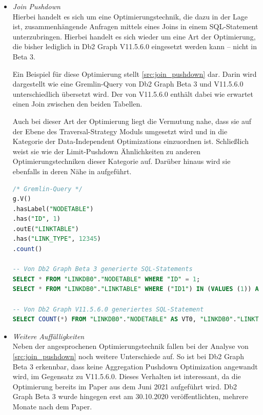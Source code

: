 \begin{itemize}
    Durch den Einsatz Optimierungstechnik, kann es somit vermieden werden, den gesamten Inhalt einer oder mehrerer Vertex- beziehungsweise Edge-Tabellen abzufragen, nur um lediglich 100 Knoten, wie im \autoref{src:nachweis_limit_pushdown} abzufragen. Daher dürfte diese Optimierung einen erheblichen Einfluss auf die Performance von Db2 Graph haben, besonders bei großen Tabellen.

    \item \textit{Join Pushdown}\\
    Hierbei handelt es sich um eine Optimierungstechnik, die dazu in der Lage ist, zusammenhängende Anfragen mittels eines Joins in einem SQL-Statement unterzubringen. Hierbei handelt es sich wieder um eine Art der Optimierung, die bisher lediglich in Db2 Graph V11.5.6.0 eingesetzt werden kann -- nicht in Beta 3.

    Ein Beispiel für diese Optimierung stellt \autoref{src:join_pushdown} dar. Darin wird dargestellt wie eine Gremlin-Query von Db2 Graph Beta 3 und V11.5.6.0 unterschiedlich übersetzt wird. Der von V11.5.6.0 enthält dabei wie erwartet einen Join zwischen den beiden Tabellen.

    Auch bei dieser Art der Optimierung liegt die Vermutung nahe, dass sie auf der Ebene des Traversal-Strategy Moduls umgesetzt wird und in die Kategorie der Data-Independent Optimizations einzuordnen ist. Schließlich weist sie wie der Limit-Pushdown Ähnlichkeiten zu anderen Optimierungstechniken dieser Kategorie auf. Darüber hinaus wird sie ebenfalls in deren Nähe in \cite{ibm_docs_optimize} aufgeführt.

\begin{lstlisting}[label=src:join_pushdown,caption={Beispiel Join Pushdown},language=SQL]
/* Gremlin-Query */
g.V()
.hasLabel("NODETABLE")
.has("ID", 1)
.outE("LINKTABLE")
.has("LINK_TYPE", 12345)
.count()

-- Von Db2 Graph Beta 3 generierte SQL-Statements
SELECT * FROM "LINKDB0"."NODETABLE" WHERE "ID" = 1;
SELECT * FROM "LINKDB0"."LINKTABLE" WHERE ("ID1") IN (VALUES (1)) AND "LINK_TYPE" = 12345;

-- Von Db2 Graph V11.5.6.0 generiertes SQL-Statement
SELECT COUNT(*) FROM "LINKDB0"."NODETABLE" AS VT0, "LINKDB0"."LINKTABLE" AS ET1 WHERE VT0."ID" = 1 AND ET1."LINK_TYPE" = 12345 AND VT0.ID = ET1.ID1
\end{lstlisting}

    \item \textit{Weitere Auffälligkeiten}\\
    Neben der angesprochenen Optimierungstechnik fallen bei der Analyse von \autoref{src:join_pushdown} noch weitere Unterschiede auf. So ist bei Db2 Graph Beta 3 erkennbar, dass keine Aggregation Pushdown Optimization angewandt wird, im Gegensatz zu V11.5.6.0. Dieses Verhalten ist interessant, da die Optimierung bereits im Paper \cite{sigmod_tian} aus dem Juni 2021 aufgeführt wird. Db2 Graph Beta 3 wurde hingegen erst am 30.10.2020 veröffentlichten, mehrere Monate nach dem Paper. 


\end{itemize}
